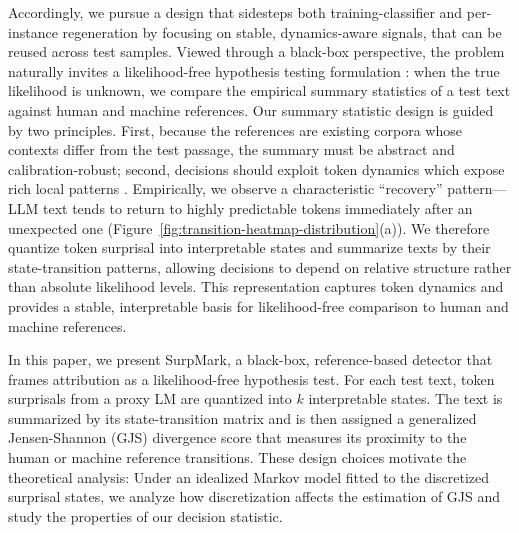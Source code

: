 \documentclass{article}
\theoremstyle{plain}
\theoremstyle{definition}
\theoremstyle{remark}
\begin{document}
Accordingly, we pursue a design that sidesteps both training-classifier and per-instance regeneration by focusing on stable, dynamics-aware signals, that can be reused across test samples. Viewed through a black-box perspective, the problem naturally invites a likelihood-free hypothesis testing formulation \cite{32134,gerber2024likelihood}:  when the true likelihood is unknown, we compare the empirical summary statistics of a test text against human and machine references. 
Our summary statistic design is guided by two principles. First, because the references are existing corpora whose contexts differ from the test passage, the summary must be abstract and calibration-robust; second, decisions should exploit token dynamics which expose rich local patterns \cite{xu2025trainingfree}. Empirically, we observe a characteristic “recovery” pattern—LLM text tends to return to highly predictable tokens immediately after an unexpected one (Figure~\ref{fig:transition-heatmap-distribution}(a)). We therefore quantize token surprisal into  interpretable states and summarize texts by their state-transition patterns, allowing decisions to depend on relative structure rather than absolute likelihood levels. This representation captures token dynamics and provides a stable, interpretable basis for likelihood-free comparison to human and machine references.

In this paper, we present SurpMark, a black-box, reference-based detector that frames attribution as a likelihood-free hypothesis test. For each test text, token surprisals from a proxy LM are quantized into $k$ interpretable states. The text is summarized by its state-transition matrix and is then assigned a generalized Jensen-Shannon (GJS) divergence score that measures its proximity to the human or machine reference transitions. 
These design choices motivate the theoretical analysis: Under an idealized Markov model fitted to the discretized surprisal states, we analyze how discretization affects the estimation of GJS and study the properties of our decision statistic.
\end{document}

